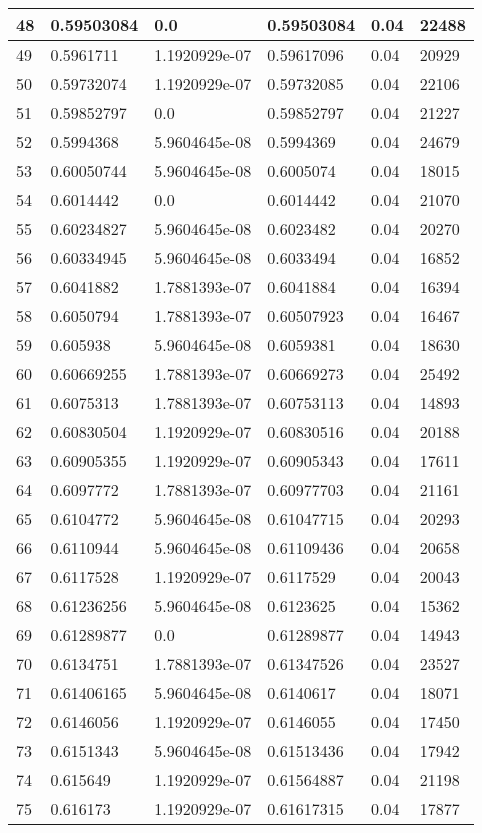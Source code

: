 \begin{longtable}{|l|l|l|l|l|l|}
48 & 0.59503084 & 0.0 & 0.59503084 & 0.04 & 22488 \\ \hline 
49 & 0.5961711 & 1.1920929e-07 & 0.59617096 & 0.04 & 20929 \\ \hline 
50 & 0.59732074 & 1.1920929e-07 & 0.59732085 & 0.04 & 22106 \\ \hline 
51 & 0.59852797 & 0.0 & 0.59852797 & 0.04 & 21227 \\ \hline 
52 & 0.5994368 & 5.9604645e-08 & 0.5994369 & 0.04 & 24679 \\ \hline 
53 & 0.60050744 & 5.9604645e-08 & 0.6005074 & 0.04 & 18015 \\ \hline 
54 & 0.6014442 & 0.0 & 0.6014442 & 0.04 & 21070 \\ \hline 
55 & 0.60234827 & 5.9604645e-08 & 0.6023482 & 0.04 & 20270 \\ \hline 
56 & 0.60334945 & 5.9604645e-08 & 0.6033494 & 0.04 & 16852 \\ \hline 
57 & 0.6041882 & 1.7881393e-07 & 0.6041884 & 0.04 & 16394 \\ \hline 
58 & 0.6050794 & 1.7881393e-07 & 0.60507923 & 0.04 & 16467 \\ \hline 
59 & 0.605938 & 5.9604645e-08 & 0.6059381 & 0.04 & 18630 \\ \hline 
60 & 0.60669255 & 1.7881393e-07 & 0.60669273 & 0.04 & 25492 \\ \hline 
61 & 0.6075313 & 1.7881393e-07 & 0.60753113 & 0.04 & 14893 \\ \hline 
62 & 0.60830504 & 1.1920929e-07 & 0.60830516 & 0.04 & 20188 \\ \hline 
63 & 0.60905355 & 1.1920929e-07 & 0.60905343 & 0.04 & 17611 \\ \hline 
64 & 0.6097772 & 1.7881393e-07 & 0.60977703 & 0.04 & 21161 \\ \hline 
65 & 0.6104772 & 5.9604645e-08 & 0.61047715 & 0.04 & 20293 \\ \hline 
66 & 0.6110944 & 5.9604645e-08 & 0.61109436 & 0.04 & 20658 \\ \hline 
67 & 0.6117528 & 1.1920929e-07 & 0.6117529 & 0.04 & 20043 \\ \hline 
68 & 0.61236256 & 5.9604645e-08 & 0.6123625 & 0.04 & 15362 \\ \hline 
69 & 0.61289877 & 0.0 & 0.61289877 & 0.04 & 14943 \\ \hline 
70 & 0.6134751 & 1.7881393e-07 & 0.61347526 & 0.04 & 23527 \\ \hline 
71 & 0.61406165 & 5.9604645e-08 & 0.6140617 & 0.04 & 18071 \\ \hline 
72 & 0.6146056 & 1.1920929e-07 & 0.6146055 & 0.04 & 17450 \\ \hline 
73 & 0.6151343 & 5.9604645e-08 & 0.61513436 & 0.04 & 17942 \\ \hline 
74 & 0.615649 & 1.1920929e-07 & 0.61564887 & 0.04 & 21198 \\ \hline 
75 & 0.616173 & 1.1920929e-07 & 0.61617315 & 0.04 & 17877 \\ \hline 
\end{longtable}